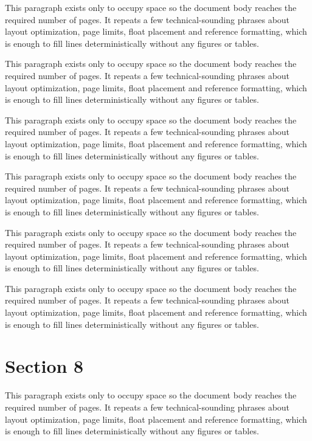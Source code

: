 \documentclass[10pt,letterpaper]{article}
\begin{document}
This paragraph exists only to occupy space so the document body reaches the required number of pages. It repeats a few technical-sounding phrases about layout optimization, page limits, float placement and reference formatting, which is enough to fill lines deterministically without any figures or tables.

This paragraph exists only to occupy space so the document body reaches the required number of pages. It repeats a few technical-sounding phrases about layout optimization, page limits, float placement and reference formatting, which is enough to fill lines deterministically without any figures or tables.

This paragraph exists only to occupy space so the document body reaches the required number of pages. It repeats a few technical-sounding phrases about layout optimization, page limits, float placement and reference formatting, which is enough to fill lines deterministically without any figures or tables.

This paragraph exists only to occupy space so the document body reaches the required number of pages. It repeats a few technical-sounding phrases about layout optimization, page limits, float placement and reference formatting, which is enough to fill lines deterministically without any figures or tables.

This paragraph exists only to occupy space so the document body reaches the required number of pages. It repeats a few technical-sounding phrases about layout optimization, page limits, float placement and reference formatting, which is enough to fill lines deterministically without any figures or tables.

This paragraph exists only to occupy space so the document body reaches the required number of pages. It repeats a few technical-sounding phrases about layout optimization, page limits, float placement and reference formatting, which is enough to fill lines deterministically without any figures or tables.

\section{Section 8}
This paragraph exists only to occupy space so the document body reaches the required number of pages. It repeats a few technical-sounding phrases about layout optimization, page limits, float placement and reference formatting, which is enough to fill lines deterministically without any figures or tables.
\end{document}
